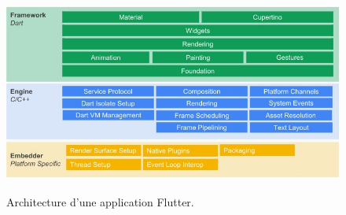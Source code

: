 \begin{figure}[h!]
	\includegraphics[width=450px,height=250px]{./Template LaTeX/Images/Architecture-dune-application-Flutter-1.jpg}
	\caption{Architecture d’une application Flutter.}
	\label{fig:birds}
\end{figure}


